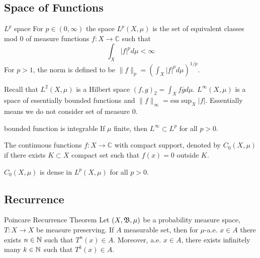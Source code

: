 \documentclass[12pt,a4paper]{article}
\begin{document}
	\subsection{Space of Functions}
	
	\begin{definition}{$L^p$ space}{}
		For $p\in (0,\infty)$ the space $L^p(X,\mu)$ is the set of equivalent classes mod 0  of measure functions $f:X\rightarrow \mathbb{C}$ such that
		$$
		\int_X |f|^p d\mu <\infty
		$$
		For $p>1$, the norm is defined to be $\|f\|_p=\left(	\int_X |f|^p d\mu\right)^{1/p}$.
	\end{definition}
	
	Recall that $L^2(X,\mu)$ is a Hilbert space $(f,g)_2=\int_X f\overline{g}d\mu$. $L^\infty(X,\mu)$ is a space of essentially bounded functions and $\|f\|_{\infty}=\text{ess}\sup_X|f|$. Essentially means we do not consider set of measure 0.
	
	\begin{proposition}{}{bounded function is integrable}
		If $\mu$ finite, then $L^{\infty}\subset L^p$ for all $p>0$.
	\end{proposition}
	
	
	\begin{definition}{}{}
		The continuous functions $f:X\rightarrow \mathbb{C}$ with compact support, denoted by $C_0(X,\mu)$ if there exists $K\subset X$ compact set such that $f(x)=0$ outside $K$.
	\end{definition}
	
	\begin{proposition}{}{}
		$C_0(X,\mu)$ is dense in $L^p(X,\mu)$ for all $p>0$.
	\end{proposition}

	\subsection{Recurrence}

	\begin{theorem}{Poincare Recurrence Theorem}{}
		Let $(X,\mathfrak{B},\mu)$ be a probability measure space,  $T:X\rightarrow X$ be measure preserving. If $A$ measurable set, then for $\mu$-a.e. $x\in A$ there exists $n\in\mathbb{N}$ such that $T^n(x)\in A$. Moreover, a.e. $x\in A$, there exists infinitely many $k\in \mathbb{N}$ such that $T^k(x)\in A$.
	\end{theorem}
\end{document}
